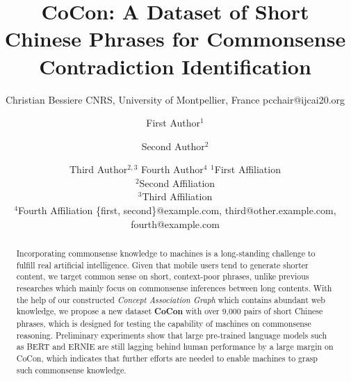 \documentclass{article}
\title{CoCon: A Dataset of Short Chinese Phrases for Commonsense Contradiction Identification}
\author{
	Christian Bessiere
	\affiliations
	CNRS, University of Montpellier, France
	\emails
	pcchair@ijcai20.org
}
\author{
	First Author$^1$
	\and
	Second Author$^2$\and
	Third Author$^{2,3}$\And
	Fourth Author$^4$
	\affiliations
	$^1$First Affiliation\\
	$^2$Second Affiliation\\
	$^3$Third Affiliation\\
	$^4$Fourth Affiliation
	\emails
	\{first, second\}@example.com,
	third@other.example.com,
	fourth@example.com
}
\begin{document}
	\maketitle
	\begin{abstract}
		Incorporating commonsense knowledge to machines is a long-standing challenge to fulfill real artificial intelligence. Given that mobile users tend to generate shorter content, we target common sense on short, context-poor phrases, unlike previous researches which mainly focus on commonsense inferences between long contents. With the help of our constructed \textit{Concept Association Graph} which contains abundant web knowledge, we propose a new dataset \textbf{CoCon} with over 9,000 pairs of short Chinese phrases, which is designed for testing the capability of machines on commonsense reasoning. Preliminary experiments show that large pre-trained language models such as BERT and ERNIE are still lagging behind human performance by a large margin on CoCon, which indicates that further efforts are needed to enable machines to grasp such commonsense knowledge. 
	\end{abstract}

	\begin{CJK}{UTF8}{gbsn}
	
	
	
	
	
	
	
	
	
	\end{CJK}
\end{document}
